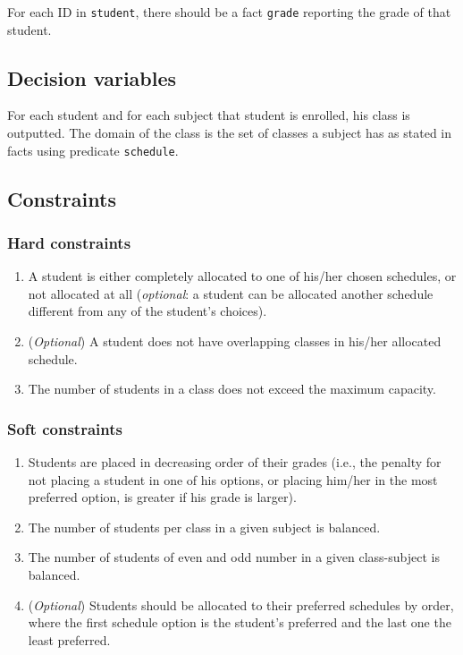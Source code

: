 \documentclass[runningheads]{llncs}
\begin{document}
For each ID in \texttt{student}, there should be a fact \texttt{grade} reporting the grade of that student.

\subsection{Decision variables}

For each student and for each subject that student is enrolled, his class is outputted. The domain of the class is the set of classes a subject has as stated in facts using predicate \texttt{schedule}.

\subsection{Constraints}

\subsubsection{Hard constraints}
\begin{enumerate}
    \item A student is either completely allocated to one of his/her chosen schedules, or not allocated at all (\textit{optional}: a student can be allocated another schedule different from any of the student's choices).
    \item (\textit{Optional}) A student does not have overlapping classes in his/her allocated schedule.
    \item The number of students in a class does not exceed the maximum capacity.
\end{enumerate}

\subsubsection{Soft constraints}
\begin{enumerate}
    \item Students are placed in decreasing order of their grades (i.e., the penalty for not placing a student in one of his options, or placing him/her in the most preferred option, is greater if his grade is larger).
    \item The number of students per class in a given subject is balanced.
    \item The number of students of even and odd number in a given class-subject is balanced.
    \item (\textit{Optional}) Students should be allocated to their preferred schedules by order, where the first schedule option is the student's preferred and the last one the least preferred.
\end{enumerate}
\end{document}
